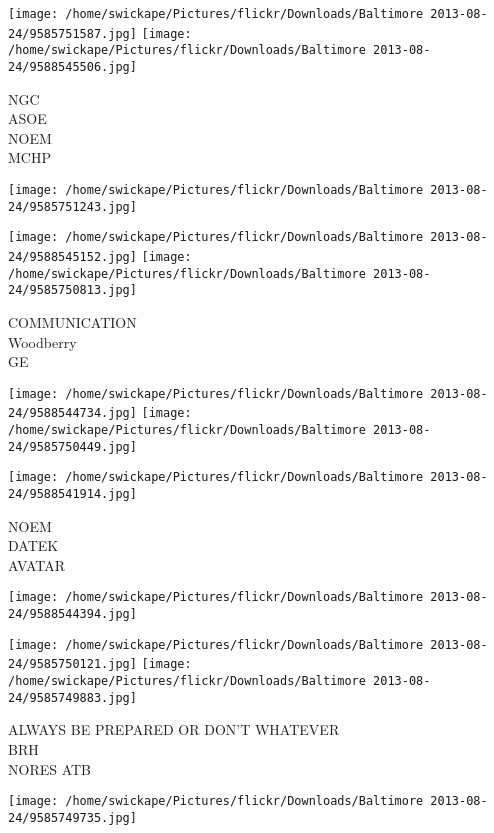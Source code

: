 \documentclass[10pt,letterpaper]{article}
\begin{document}
\texttt{[image: /home/swickape/Pictures/flickr/Downloads/Baltimore 2013-08-24/9585751587.jpg]}
\texttt{[image: /home/swickape/Pictures/flickr/Downloads/Baltimore 2013-08-24/9588545506.jpg]}

NGC\\
ASOE\\
NOEM\\
MCHP\\
\pagebreak

\texttt{[image: /home/swickape/Pictures/flickr/Downloads/Baltimore 2013-08-24/9585751243.jpg]}

\vspace{0.25in}
\texttt{[image: /home/swickape/Pictures/flickr/Downloads/Baltimore 2013-08-24/9588545152.jpg]}
\texttt{[image: /home/swickape/Pictures/flickr/Downloads/Baltimore 2013-08-24/9585750813.jpg]}

COMMUNICATION\\
Woodberry\\
GE\\
\pagebreak

\texttt{[image: /home/swickape/Pictures/flickr/Downloads/Baltimore 2013-08-24/9588544734.jpg]}
\texttt{[image: /home/swickape/Pictures/flickr/Downloads/Baltimore 2013-08-24/9585750449.jpg]}

\texttt{[image: /home/swickape/Pictures/flickr/Downloads/Baltimore 2013-08-24/9588541914.jpg]}

NOEM\\
DATEK\\
AVATAR\\
\pagebreak

\texttt{[image: /home/swickape/Pictures/flickr/Downloads/Baltimore 2013-08-24/9588544394.jpg]}

\vspace{0.25in}
\texttt{[image: /home/swickape/Pictures/flickr/Downloads/Baltimore 2013-08-24/9585750121.jpg]}
\texttt{[image: /home/swickape/Pictures/flickr/Downloads/Baltimore 2013-08-24/9585749883.jpg]}

ALWAYS BE PREPARED OR DON'T WHATEVER\\
BRH\\
NORES ATB\\
\pagebreak

\texttt{[image: /home/swickape/Pictures/flickr/Downloads/Baltimore 2013-08-24/9585749735.jpg]}
\end{document}
